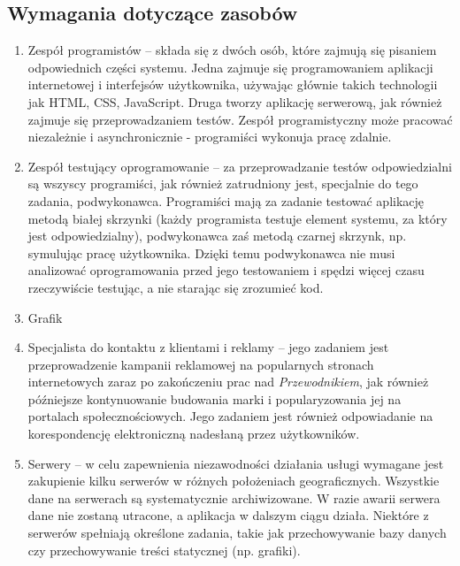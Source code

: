 \documentclass[12pt,a4paper]{report}
\begin{document}
\subsection{Wymagania dotyczące zasobów}
\begin{enumerate}
	\item Zespół programistów -- składa się z dwóch osób, które zajmują się pisaniem odpowiednich części systemu. Jedna zajmuje się programowaniem aplikacji internetowej i interfejsów użytkownika, używając głównie takich technologii jak HTML, CSS, JavaScript. Druga tworzy aplikację serwerową, jak również zajmuje się przeprowadzaniem testów. Zespół programistyczny może pracować niezależnie i asynchronicznie - programiści wykonuja pracę zdalnie. 
	\item Zespół testujący oprogramowanie -- za przeprowadzanie testów odpowiedzialni są wszyscy programiści, jak również zatrudniony jest, specjalnie do tego zadania, podwykonawca. Programiści mają za zadanie testować aplikację metodą białej skrzynki (każdy programista testuje element systemu, za który jest odpowiedzialny), podwykonawca zaś metodą czarnej skrzynk, np. symulując pracę użytkownika. Dzięki temu podwykonawca nie musi analizować oprogramowania przed jego testowaniem i spędzi więcej czasu rzeczywiście testując, a nie starając się zrozumieć kod.
	\item Grafik
	\item Specjalista do kontaktu z klientami i reklamy -- jego zadaniem jest przeprowadzenie kampanii reklamowej na popularnych stronach internetowych zaraz po zakończeniu prac nad \emph{Przewodnikiem}, jak również późniejsze kontynuowanie budowania marki i popularyzowania jej na portalach społecznościowych. Jego zadaniem jest również odpowiadanie na korespondencję elektroniczną nadesłaną przez użytkowników.
	\item Serwery -- w celu zapewnienia niezawodności działania usługi wymagane jest zakupienie kilku serwerów w różnych położeniach geograficznych. Wszystkie dane na serwerach są systematycznie archiwizowane. W razie awarii serwera dane nie zostaną utracone, a aplikacja w dalszym ciągu działa. Niektóre z serwerów spełniają określone zadania, takie jak przechowywanie bazy danych czy przechowywanie treści statycznej (np. grafiki). 
\end{enumerate}
\end{document}
